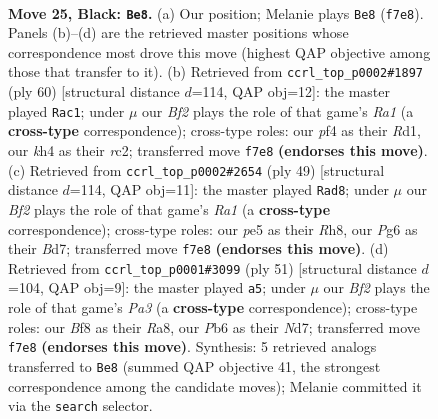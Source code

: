 \documentclass[11pt]{article}
\begin{document}
\clearpage

\begin{figure}[p]\centering
\begin{subfigure}{0.46\textwidth}\centering
\resizebox{\linewidth}{!}{%
\newchessgame
\chessboard[
  setfen={3r1bn1/p1k2br1/1p2p1p1/nP1pP1Pp/P2P1P1K/8/3N4/RNB2B1R b - - 5 25},
  showmover=false,
  pgfstyle=straightmove, color=movearrow, markmove={f7-e8}
]}
\caption{}
\end{subfigure}\hfill
\begin{subfigure}{0.46\textwidth}\centering
\resizebox{\linewidth}{!}{%
\newchessgame
\chessboard[
  setfen={r5k1/1p2bpp1/4p2p/p2pP2P/Pn1P2P1/1P2B3/2r1NP2/R2R1K2 w - - 2 31},
  showmover=false,
  pgfstyle=straightmove, color=movearrow, markmove={a1-c1}
]}
\caption{}
\end{subfigure}
\\[4pt]
\begin{subfigure}{0.46\textwidth}\centering
\resizebox{\linewidth}{!}{%
\newchessgame
\chessboard[
  setfen={r6r/2kbnpp1/3pp3/p5Pn/Pp1NPP2/1P2B3/2P5/2KR1BR1 b - - 1 25},
  showmover=false,
  pgfstyle=straightmove, color=movearrow, markmove={a8-d8}
]}
\caption{}
\end{subfigure}\hfill
\begin{subfigure}{0.46\textwidth}\centering
\resizebox{\linewidth}{!}{%
\newchessgame
\chessboard[
  setfen={r7/2rnkp2/p1n1b1p1/4p1Pp/N2pP2P/3N1P2/PPPK4/R4B1R b - - 6 26},
  showmover=false,
  pgfstyle=straightmove, color=movearrow, markmove={a6-a5}
]}
\caption{}
\end{subfigure}
\caption{\textbf{Move 25, Black: \texttt{Be8}.} (a) Our position; Melanie plays \texttt{Be8} (\texttt{f7e8}). Panels (b)--(d) are the retrieved master positions whose correspondence most drove this move (highest QAP objective among those that transfer to it). (b) Retrieved from \texttt{ccrl\_top\_p0002\#1897} (ply 60) [structural distance $d$=114, QAP obj=12]: the master played \texttt{Rac1}; under $\mu$ our \emph{Bf2} plays the role of that game's \emph{Ra1} (a \textbf{cross-type} correspondence); cross-type roles: our \emph{p}f4 as their \emph{R}d1, our \emph{k}h4 as their \emph{r}c2; transferred move \texttt{f7e8} \textbf{(endorses this move)}. (c) Retrieved from \texttt{ccrl\_top\_p0002\#2654} (ply 49) [structural distance $d$=114, QAP obj=11]: the master played \texttt{Rad8}; under $\mu$ our \emph{Bf2} plays the role of that game's \emph{Ra1} (a \textbf{cross-type} correspondence); cross-type roles: our \emph{p}e5 as their \emph{R}h8, our \emph{P}g6 as their \emph{B}d7; transferred move \texttt{f7e8} \textbf{(endorses this move)}. (d) Retrieved from \texttt{ccrl\_top\_p0001\#3099} (ply 51) [structural distance $d$=104, QAP obj=9]: the master played \texttt{a5}; under $\mu$ our \emph{Bf2} plays the role of that game's \emph{Pa3} (a \textbf{cross-type} correspondence); cross-type roles: our \emph{B}f8 as their \emph{R}a8, our \emph{P}b6 as their \emph{N}d7; transferred move \texttt{f7e8} \textbf{(endorses this move)}. Synthesis: 5 retrieved analogs transferred to \texttt{Be8} (summed QAP objective 41, the strongest correspondence among the candidate moves); Melanie committed it via the \texttt{search} selector.}
\label{fig:thought-m49}
\end{figure}
\end{document}
